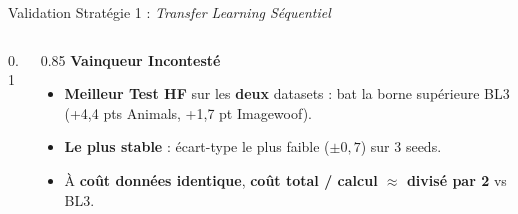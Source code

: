 \documentclass[aspectratio=169, 10pt]{beamer}
\begin{document}
\begin{frame}{Validation Stratégie 1 : \textit{Transfer Learning Séquentiel}}
  \vspace{0.5cm}
  \begin{columns}[T]
    \begin{column}{0.1\textwidth}
      \centering
      {\Huge\color{success}\faTrophy}
    \end{column}
    \begin{column}{0.85\textwidth}
      \textbf{\color{primary}Vainqueur Incontesté}
      \begin{itemize}\footnotesize
        \item \textbf{Meilleur Test HF} sur les \textbf{deux} datasets : bat la borne supérieure BL3 (+4,4 pts Animals, +1,7 pt Imagewoof).
        \item \textbf{Le plus stable} : écart-type le plus faible ($\pm0,7$) sur 3 seeds.
        \item À \textbf{coût données identique}, \textbf{coût total / calcul $\approx$ divisé par 2} vs BL3.
      \end{itemize}
    \end{column}
  \end{columns}

\end{frame}
\end{document}

